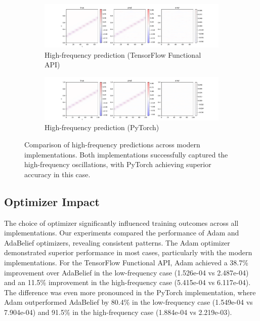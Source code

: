 \documentclass[10pt,journal,compsoc,onecolumn]{IEEEtran}
\begin{document}
\begin{figure}[htbp]
    \centering
    \begin{subfigure}[b]{0.9\textwidth}
        \includegraphics[width=\textwidth]{../../results/functional/high-frequency-adam-20250206-1520-1/vis}
        \caption{High-frequency prediction (TensorFlow Functional API)}
        \label{fig:high_freq_functional}
    \end{subfigure}
    \begin{subfigure}[b]{0.9\textwidth}
        \includegraphics[width=\textwidth]{../../results/pytorch/high-frequency-adam-20250206-1607-5/vis}
        \caption{High-frequency prediction (PyTorch)}
        \label{fig:high_freq_pytorch}
    \end{subfigure}
    \caption{Comparison of high-frequency predictions across modern implementations. Both implementations successfully captured the high-frequency oscillations, with PyTorch achieving superior accuracy in this case.}
    \label{fig:high_freq_comparison}
\end{figure}

\subsection{Optimizer Impact}
The choice of optimizer significantly influenced training outcomes across all implementations. Our experiments compared the performance of Adam and AdaBelief optimizers, revealing consistent patterns. The Adam optimizer demonstrated superior performance in most cases, particularly with the modern implementations. For the TensorFlow Functional API, Adam achieved a 38.7\% improvement over AdaBelief in the low-frequency case (1.526e-04 vs 2.487e-04) and an 11.5\% improvement in the high-frequency case (5.415e-04 vs 6.117e-04). The difference was even more pronounced in the PyTorch implementation, where Adam outperformed AdaBelief by 80.4\% in the low-frequency case (1.549e-04 vs 7.904e-04) and 91.5\% in the high-frequency case (1.884e-04 vs 2.219e-03).
\end{document}
